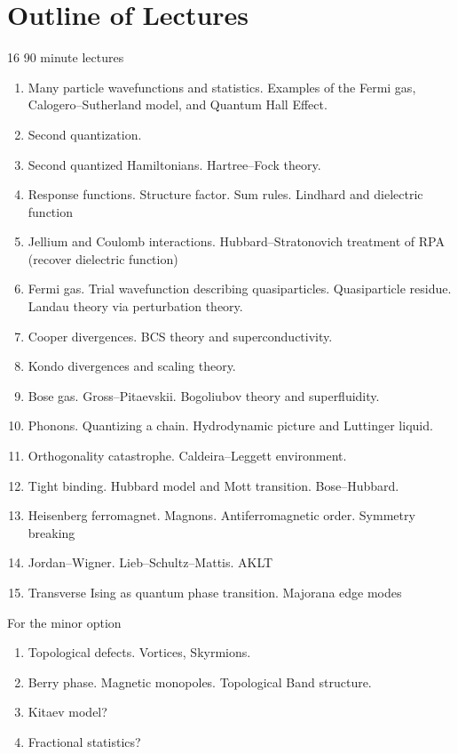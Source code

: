 \section{Outline of Lectures}

16 90 minute lectures

\begin{enumerate}
\item Many particle wavefunctions and statistics. Examples of the Fermi gas, Calogero--Sutherland model, and Quantum Hall Effect.

\item Second quantization. 

\item Second quantized Hamiltonians. Hartree--Fock theory.

\item Response functions. Structure factor. Sum rules. Lindhard and dielectric function

\item Jellium and Coulomb interactions. Hubbard--Stratonovich treatment of RPA (recover dielectric function)

\item Fermi gas. Trial wavefunction describing quasiparticles. Quasiparticle residue. Landau theory via perturbation theory. 

\item Cooper divergences. BCS theory and superconductivity. 

\item Kondo divergences and scaling theory.

\item Bose gas. Gross--Pitaevskii. Bogoliubov theory and superfluidity.

\item Phonons. Quantizing a chain. Hydrodynamic picture and Luttinger liquid.

\item Orthogonality catastrophe. Caldeira--Leggett environment.

\item Tight binding. Hubbard model and Mott transition. Bose--Hubbard.

\item Heisenberg ferromagnet. Magnons. Antiferromagnetic order. Symmetry breaking

\item Jordan--Wigner. Lieb--Schultz--Mattis. AKLT

\item Transverse Ising as quantum phase transition. Majorana edge modes

\end{enumerate}

For the minor option

\begin{enumerate}

\item Topological defects. Vortices, Skyrmions. 

\item Berry phase. Magnetic monopoles. Topological Band structure.

\item Kitaev model?

\item Fractional statistics?
\end{enumerate}